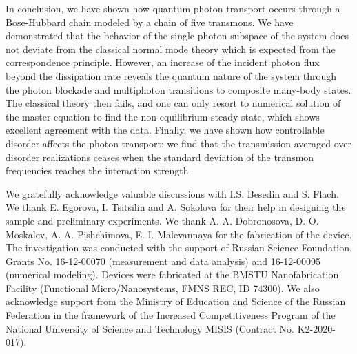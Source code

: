 \documentclass[%
 aps, prl,
 amsmath,amssymb,
 reprint,%
superscriptaddress
]{revtex4-2}
\begin{document}
In conclusion, we have shown how quantum photon transport occurs through a Bose-Hubbard chain modeled by a chain of five transmons. We have demonstrated that the behavior of the single-photon subspace of the system does not deviate from the classical normal mode theory which is expected from the correspondence principle. However, an increase of the incident photon flux beyond the dissipation rate reveals the quantum nature of the system through the photon blockade and multiphoton transitions to composite many-body states. The classical theory then fails, and one can only resort to numerical solution of the master equation to find the non-equilibrium steady state, which shows excellent agreement with the data. Finally, we have shown how controllable disorder affects the photon transport: we find that the transmission averaged over disorder realizations ceases when the standard deviation of the transmon frequencies reaches the interaction strength.

We gratefully acknowledge valuable discussions with I.S. Besedin and S. Flach. We thank E. Egorova, I. Tsitsilin and A. Sokolova for their help in designing the sample and preliminary experiments. We thank  A. A. Dobronosova, D. O. Moskalev, A. A. Pishchimova, E. I. Malevannaya for the fabrication of the device. The investigation was conducted with the support of Russian Science Foundation, Grants No. 16-12-00070 (measurement and data analysis) and 16-12-00095 (numerical modeling). Devices were fabricated at the BMSTU Nanofabrication Facility (Functional Micro/Nanosystems, FMNS REC, ID 74300). We also acknowledge support from the Ministry of Education and Science of the Russian Federation in the framework of the Increased Competitiveness Program of the National University of Science and Technology MISIS (Contract No. K2-2020-017). 


\end{document}
